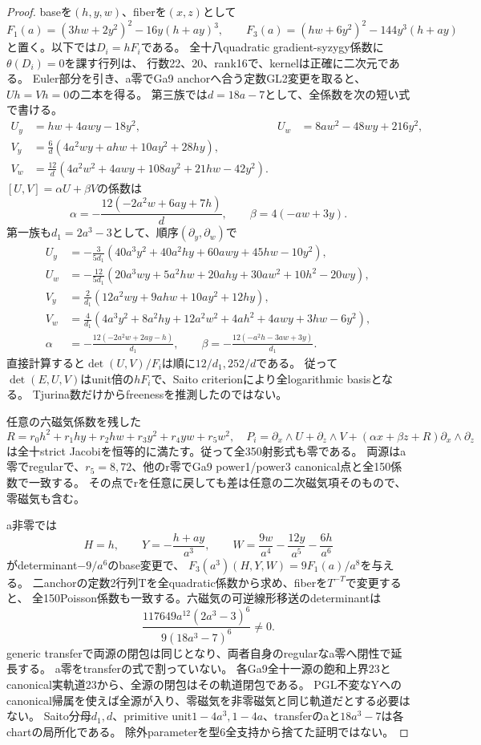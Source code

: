 \documentclass[a4paper,11pt]{ltjsarticle}
\theoremstyle{definition}
\begin{document}
\begin{proof}
baseを$(h,y,w)$、fiberを$(x,z)$として
\[
 F_1(a)=(3hw+2y^2)^2-16y(h+ay)^3,\qquad
 F_3(a)=(hw+6y^2)^2-144y^3(h+ay)
\]
と置く。以下では$D_i=hF_i$である。
全十八quadratic gradient-syzygy係数に$\theta(D_i)=0$を課す行列は、
行数22、20、rank16で、kernelは正確に二次元である。
Euler部分を引き、a零でGa9 anchorへ合う定数GL2変更を取ると、$U h=V h=0$の二本を得る。
第三族では$d=18a-7$として、全係数を次の短い式で書ける。
\[
 \begin{aligned}
 U_y&=hw+4awy-18y^2,&U_w&=8aw^2-48wy+216y^2,\\
 V_y&=\frac6d(4a^2wy+ahw+10ay^2+28hy),\\
 V_w&=\frac{12}d(4a^2w^2+4awy+108ay^2+21hw-42y^2).
 \end{aligned}
\]
$[U,V]=\alpha U+\beta V$の係数は
\[
 \alpha=-\frac{12(-2a^2w+6ay+7h)}d,\qquad \beta=4(-aw+3y).
\]
第一族も$d_1=2a^3-3$として、順序$(\partial_y,\partial_w)$で
\[
\begin{aligned}
 U_y&=-\frac3{5d_1}(40a^3y^2+40a^2hy+60awy+45hw-10y^2),\\
 U_w&=-\frac{12}{5d_1}(20a^3wy+5a^2hw+20ahy+30aw^2+10h^2-20wy),\\
 V_y&=\frac2{d_1}(12a^2wy+9ahw+10ay^2+12hy),\\
 V_w&=\frac4{d_1}(4a^3y^2+8a^2hy+12a^2w^2+4ah^2+4awy+3hw-6y^2),\\
 \alpha&=-\frac{12(-2a^2w+2ay-h)}{d_1},\qquad
 \beta=-\frac{12(-a^2h-3aw+3y)}{d_1}.
\end{aligned}
\]
直接計算すると$\det(U,V)/F_i$は順に$12/d_1,252/d$である。
従って$\det(E,U,V)$はunit倍の$hF_i$で、Saito criterionにより全logarithmic basisとなる。
Tjurina数だけからfreenessを推測したのではない。

任意の六磁気係数を残した
\[
 R=r_0h^2+r_1hy+r_2hw+r_3y^2+r_4yw+r_5w^2,
 \quad
 P_i=\partial_x\wedge U+\partial_z\wedge V+
       (\alpha x+\beta z+R)\partial_x\wedge\partial_z
\]
は全十strict Jacobiを恒等的に満たす。従って全350射影式も零である。
両源はa零でregularで、$r_5=8,72$、他のr零でGa9 power1/power3 canonical点と全150係数で一致する。
その点でrを任意に戻しても差は任意の二次磁気項そのもので、零磁気も含む。

a非零では
\[
 H=h,\qquad Y=-\frac{h+ay}{a^3},\qquad
 W=\frac{9w}{a^4}-\frac{12y}{a^5}-\frac{6h}{a^6}
\]
がdeterminant$-9/a^6$のbase変更で、
$F_3(a^3)(H,Y,W)=9F_1(a)/a^8$を与える。
二anchorの定数2行列Tを全quadratic係数から求め、fiberを$T^{-T}$で変更すると、
全150Poisson係数も一致する。六磁気の可逆線形移送のdeterminantは
\[
 \frac{117649a^{12}(2a^3-3)^6}{9(18a^3-7)^6}\ne0.
\]
generic transferで両源の閉包は同じとなり、両者自身のregularなa零へ閉性で延長する。
a零をtransferの式で割っていない。
各Ga9全十一源の飽和上界23とcanonical実軌道23から、全源の閉包はその軌道閉包である。
PGL不変なYへのcanonical帰属を使えば全源が入り、零磁気を非零磁気と同じ軌道だとする必要はない。
Saito分母$d_1,d$、primitive unit$1-4a^3,1-4a$、transferのaと$18a^3-7$は各chartの局所化である。
除外parameterを型6全支持から捨てた証明ではない。


\end{proof}
\end{document}
